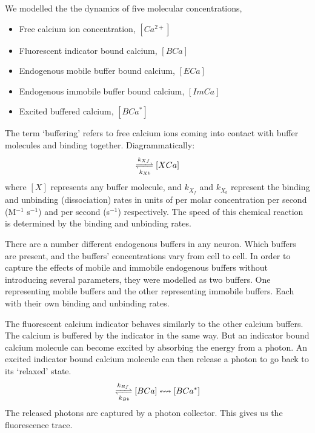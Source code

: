 \documentclass[a4paper,12pt]{article}
\theoremstyle{definition}
\begin{document}
We modelled the the dynamics of five molecular concentrations,
\begin{itemize}
    \item Free calcium ion concentration, $[Ca^{2+}]$
    \item Fluorescent indicator bound calcium, $[BCa]$
    \item Endogenous mobile buffer bound calcium, $[ECa]$
    \item Endogenous immobile buffer bound calcium, $[ImCa]$
    \item Excited buffered calcium, $[BCa^{\ast}]$
\end{itemize}
The term ‘buffering’ refers to free calcium ions coming into contact with buffer molecules and binding together. Diagrammatically:
\begin{align*}
    [X][Ca^{2+}] \xrightleftharpoons[k_{Xb}]{k_{Xf}} [XCa]
\end{align*}
where $[X]$ represents any buffer molecule, and $k_{X_f}$ and $k_{X_b}$ represent the binding and unbinding (dissociation) rates in units of per molar concentration per second (M$^{−1}$ s$^{−1}$) and per second (s$^{−1}$) respectively. The speed of this chemical reaction is determined by the binding and unbinding rates.

There are a number different endogenous buffers in any neuron. Which buffers are present, and the buffers’ concentrations vary from cell to cell. In order to capture the effects of mobile and immobile endogenous buffers without introducing several parameters, they were modelled as two buffers. One representing mobile buffers and the other representing immobile buffers. Each with their own binding and unbinding rates.

The fluorescent calcium indicator behaves similarly to the other calcium buffers. The calcium is buffered by the indicator in the same way. But an indicator bound calcium molecule can become excited by absorbing the energy from a photon. An excited indicator bound calcium molecule can then release a photon to go back to its ‘relaxed’ state.
\begin{align*}
    [B][Ca^{2+}] \xrightleftharpoons[k_{Bb}]{k_{Bf}} [BCa] \leftrightsquigarrow [BCa^{\ast}]
\end{align*}
The released photons are captured by a photon collector. This gives us the fluorescence trace.
\end{document}
